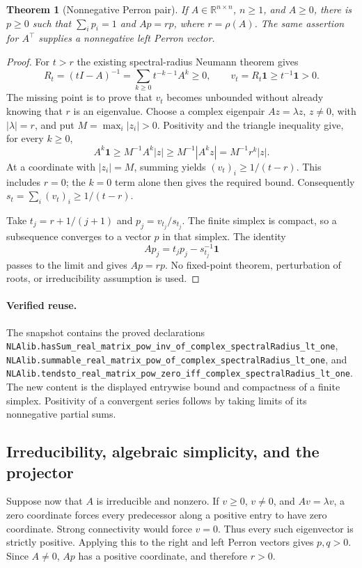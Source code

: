\documentclass[11pt,a4paper]{article}
\newcommand{\R}{\mathbb R}
\DeclareRobustCommand{\code}[1]{{\footnotesize\urlstyle{tt}\nolinkurl{#1}}}
\newtheorem{theorem}{Theorem}[section]
\begin{document}
\begin{theorem}[Nonnegative Perron pair]
If $A\in\R^{n\times n}$, $n\ge1$, and $A\ge0$, there is $p\ge0$ such that
$\sum_i p_i=1$ and $Ap=rp$, where $r=\rho(A)$. The same assertion for
$A^\top$ supplies a nonnegative left Perron vector.
\end{theorem}
\begin{proof}
For $t>r$ the existing spectral-radius Neumann theorem gives
\[
 R_t=(tI-A)^{-1}=\sum_{k\ge0}t^{-k-1}A^k\ge0,
 \qquad v_t=R_t\boldsymbol1\ge t^{-1}\boldsymbol1>0.
\]
The missing point is to prove that $v_t$ becomes unbounded without already
knowing that $r$ is an eigenvalue. Choose a complex eigenpair
$Az=\lambda z$, $z\ne0$, with $|\lambda|=r$, and put
$M=\max_i|z_i|>0$. Positivity and the triangle inequality give, for every
$k\ge0$,
\[
 A^k\boldsymbol1\ge M^{-1}A^k|z|
       \ge M^{-1}|A^kz|=M^{-1}r^k|z|.
\]
At a coordinate with $|z_i|=M$, summing yields
$(v_t)_i\ge1/(t-r)$. This includes $r=0$; the $k=0$ term alone then gives
the required bound. Consequently $s_t=\sum_i(v_t)_i\ge1/(t-r)$.

Take $t_j=r+1/(j+1)$ and $p_j=v_{t_j}/s_{t_j}$. The finite simplex is
compact, so a subsequence converges to a vector $p$ in that simplex. The
identity
\[
 A p_j=t_jp_j-s_{t_j}^{-1}\boldsymbol1
\]
passes to the limit and gives $Ap=rp$. No fixed-point theorem, perturbation
of roots, or irreducibility assumption is used.
\end{proof}

\paragraph{Verified reuse.}
The snapshot contains the proved declarations
\code{NLAlib.hasSum_real_matrix_pow_inv_of_complex_spectralRadius_lt_one},
\code{NLAlib.summable_real_matrix_pow_of_complex_spectralRadius_lt_one},
and \code{NLAlib.tendsto_real_matrix_pow_zero_iff_complex_spectralRadius_lt_one}.
The new content is the displayed entrywise bound and compactness of a finite
simplex. Positivity of a convergent series follows by taking limits of its
nonnegative partial sums.

\subsection{Irreducibility, algebraic simplicity, and the projector}

Suppose now that $A$ is irreducible and nonzero. If $v\ge0$, $v\ne0$,
and $Av=\lambda v$, a zero coordinate forces every predecessor along a
positive entry to have zero coordinate. Strong connectivity would force
$v=0$. Thus every such eigenvector is strictly positive. Applying this to
the right and left Perron vectors gives $p,q>0$. Since $A\ne0$, $Ap$ has
a positive coordinate, and therefore $r>0$.
\end{document}
